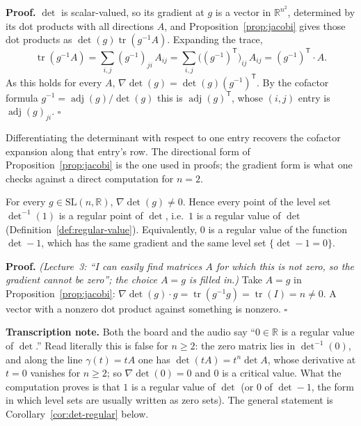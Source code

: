 \documentclass[11pt]{report}
\makeatletter
\newcounter{thmcounter}[section]
\renewenvironment{proof}[1][Proof]{\noindent\textbf{#1.} }{\hfill$\square$\par\vspace{5pt}}
\newcommand{\thmlabel}[1]{\edef\@currentlabel{\arabic{section}.\arabic{thmcounter}}\label{#1}}
\newcommand{\SL}{\mathrm{SL}}
\DeclareMathOperator{\tr}{tr}
\DeclareMathOperator{\adj}{adj}
\newcommand{\leeref}[1]{\par\smallskip{\raggedleft\footnotesize\textsc{Lee}:\ #1\par}}
\makeatother
\begin{document}
\begin{proof}
$\det$ is scalar-valued, so its gradient at $g$ is a vector in $\mathbb{R}^{n^2}$, determined by its dot products with all directions $A$, and Proposition~\ref{prop:jacobi} gives those dot products as $\det(g)\tr(g^{-1}A)$. Expanding the trace,
\[
\tr(g^{-1}A) = \sum_{i,j} (g^{-1})_{ji}\, A_{ij} = \sum_{i,j} \big((g^{-1})^{\mathsf T}\big)_{ij}\, A_{ij} = (g^{-1})^{\mathsf T} \cdot A .
\]
As this holds for every $A$, $\nabla\det(g) = \det(g)(g^{-1})^{\mathsf T}$. By the cofactor formula $g^{-1} = \adj(g)/\det(g)$ this is $\adj(g)^{\mathsf T}$, whose $(i,j)$ entry is $\adj(g)_{ji}$.
\end{proof}

\begin{rembox}\label{rem:gradient-itself}
Differentiating the determinant with respect to one entry recovers the cofactor expansion along that entry's row. The directional form of Proposition~\ref{prop:jacobi} is the one used in proofs; the gradient form is what one checks against a direct computation for $n = 2$.
\end{rembox}

\begin{corbox}\thmlabel{cor:regular-value}
For every $g \in \SL(n,\mathbb{R})$, $\nabla \det(g) \neq 0$. Hence every point of the level set $\det^{-1}(1)$ is a regular point of $\det$, i.e.\ $1$ is a regular value of $\det$ (Definition~\ref{def:regular-value}). Equivalently, $0$ is a regular value of the function $\det - 1$, which has the same gradient and the same level set $\{\det - 1 = 0\}$.
\leeref{Ch.~7, p.~158}
\end{corbox}

\begin{proof}
\textit{(Lecture~3: ``I can easily find matrices $A$ for which this is not zero, so the gradient cannot be zero''; the choice $A = g$ is filled in.)} Take $A = g$ in Proposition~\ref{prop:jacobi}: $\nabla\det(g) \cdot g = \tr(g^{-1} g) = \tr(I) = n \neq 0$. A vector with a nonzero dot product against something is nonzero.
\end{proof}

\textbf{Transcription note.} Both the board and the audio say ``$0 \in \mathbb{R}$ is a regular value of $\det$.'' Read literally this is false for $n \ge 2$: the zero matrix lies in $\det^{-1}(0)$, and along the line $\gamma(t) = tA$ one has $\det(tA) = t^n \det A$, whose derivative at $t = 0$ vanishes for $n \ge 2$; so $\nabla\det(0) = 0$ and $0$ is a critical value. What the computation proves is that $1$ is a regular value of $\det$ (or $0$ of $\det - 1$, the form in which level sets are usually written as zero sets). The general statement is Corollary~\ref{cor:det-regular} below.
\end{document}
